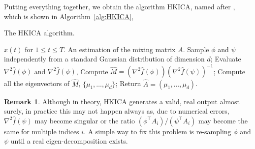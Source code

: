 \documentclass[jmlr]{article}
\theoremstyle{definition}
\newtheorem{remark}[lemma]{Remark}
\begin{document}
Putting everything together, we obtain the algorithm HKICA, named after \citet{hsu2013learning}, which is shown in Algorithm~\ref{alg:HKICA},
\begin{algorithm}[H]
\caption{The HKICA algorithm.}
\label{alg:HKICA}
\begin{algorithmic}[1]
\INPUT $x(t)$ for $1\le t \le T$. 
\OUTPUT An estimation of the mixing matrix $A$. 
\STATE Sample $\phi$ and $\psi$ independently from a standard Gaussian distribution of dimension $d$;
\STATE Evaluate $\nabla^2\hat{f}(\phi)$ and $\nabla^2\hat{f}(\psi)$, 
\STATE Compute $\hat{M} = (\nabla^2 \hat{f}(\phi))(\nabla^2\hat{f}(\psi))^{-1}$;
\STATE Compute all the eigenvectors of $\hat{M}$, $\{\mu_1,\ldots,\mu_d\}$;
\STATE Return $\hat{A} = (\mu_1,\ldots,\mu_d)$.
\end{algorithmic}
\end{algorithm}

\begin{remark}%
\label{rmk:symmetrization} 
Although in theory, HKICA generates a valid, real output almost surely, in practice this may not happen always as, due to numerical errors, $\nabla^2\hat{f}(\psi)$ may become singular or the ratio $(\phi^\top A_i)/(\psi^\top A_i)$ may become the same for multiple indices $i$. A simple way to fix this problem is re-sampling $\phi$ and $\psi$ until a real eigen-decomposition exists.

\end{remark}
\end{document}

